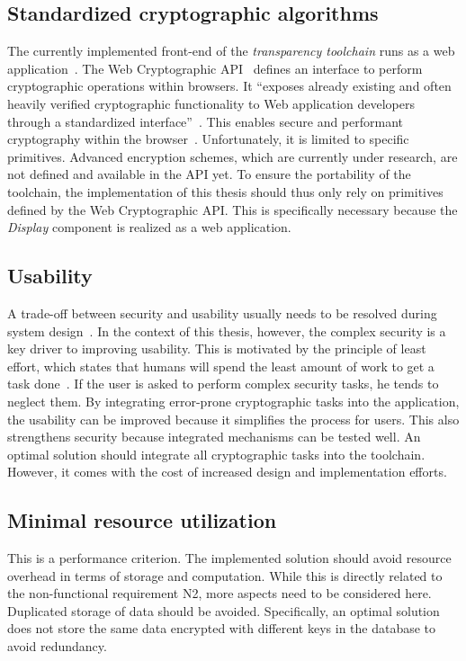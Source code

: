 \documentclass[../main.tex]{subfiles}
\begin{document}
\subsection{Standardized cryptographic algorithms}
The currently implemented front-end of the \emph{transparency toolchain} runs as a web application~\cite{Zieglmeier2021}. 
The Web Cryptographic API~\cite{WebCryptoApi2017} defines an interface to perform cryptographic operations within browsers. 
It \enquote{exposes already existing and often heavily verified cryptographic functionality to Web application developers through a standardized interface}~\cite[959]{Halpin2014}.
This enables secure and performant cryptography within the browser~\cite{Halpin2014}.
Unfortunately, it is limited to specific primitives. 
Advanced encryption schemes, which are currently under research, are not defined and available in the API yet.
To ensure the portability of the toolchain, the implementation of this thesis should thus only rely on primitives defined by the Web Cryptographic API.
This is specifically necessary because the \emph{Display} component is realized as a web application.

\subsection{Usability}
A trade-off between security and usability usually needs to be resolved during system design~\cite{Braz2007}.
In the context of this thesis, however, the complex security is a key driver to improving usability.
This is motivated by the principle of least effort, which states that humans will spend the least amount of work to get a task done~\cite{Levenson2018}.
If the user is asked to perform complex security tasks, he tends to neglect them.
By integrating error-prone cryptographic tasks into the application, the usability can be improved because it simplifies the process for users.
This also strengthens security because integrated mechanisms can be tested well.
An optimal solution should integrate all cryptographic tasks into the toolchain.
However, it comes with the cost of increased design and implementation efforts.

\subsection{Minimal resource utilization}
This is a performance criterion.
The implemented solution should avoid resource overhead in terms of storage and computation.
While this is directly related to the non-functional requirement N2, more aspects need to be considered here.
Duplicated storage of data should be avoided.
Specifically, an optimal solution does not store the same data encrypted with different keys in the database to avoid redundancy.
\end{document}
